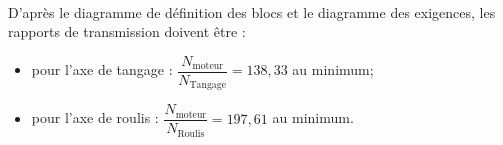 \ifprof~\\
D'après le diagramme de définition des blocs et le diagramme des exigences, les rapports de transmission doivent être : 
\begin{itemize}
\item pour l'axe de tangage : $\dfrac{N_{\text{moteur}}}{N_{\text{Tangage}}}=138,33$ au minimum; 
\item pour l'axe de roulis :  $\dfrac{N_{\text{moteur}}}{N_{\text{Roulis}}}= 197,61$ au minimum.
\end{itemize}
\else
\fi
%
%

